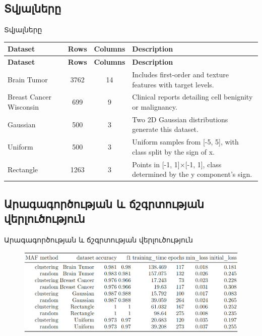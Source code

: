 \documentclass[aspectratio=169]{beamer}
\begin{document}
\subsection{{Տվյալները}}
\begin{frame}{Տվյալները}
{\rm
\begin{longtable}{|>{\raggedright\arraybackslash}p{3cm}|c|c|>{\raggedright\arraybackslash}p{5cm}|}
\hline
\textbf{Dataset} & \textbf{Rows} & \textbf{Columns} & \textbf{Description} \\ \hline
\endfirsthead
\hline
\textbf{Dataset} & \textbf{Rows} & \textbf{Columns} & \textbf{Description} \\ \hline
\endhead
Brain Tumor & 3762 & 14 & Includes first-order and texture features with target levels. \\ \hline
Breast Cancer Wisconsin & 699 & 9 & Clinical reports detailing cell benignity or malignancy. \\ \hline
Gaussian & 500 & 3 & Two 2D Gaussian distributions generate this dataset. \\ \hline
Uniform & 500 & 3 & Uniform samples from [-5, 5], with class split by the sign of x. \\ \hline
Rectangle & 1263 & 3 & Points in [-1, 1]×[-1, 1], class determined by the y component's sign. \\ \hline
\end{longtable}
    }
\end{frame}

\subsection{Արագագործության և ճշգրտության վերլուծություն}
\begin{frame}{Արագագործության և ճշգրտության վերլուծություն}
\begin{figure}
    \centering
    \includegraphics[width=0.95\linewidth]{acc_speedup_table.png}
    \label{fig:enter-label}
\end{figure}
\end{frame}
\end{document}
